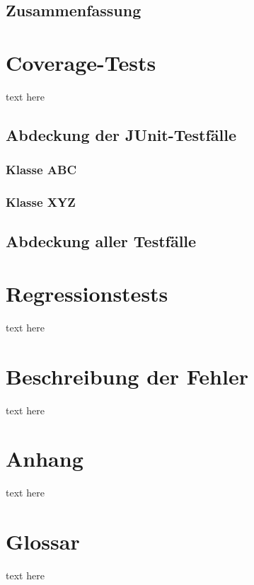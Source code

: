 \documentclass{article}
\begin{document}
  \subsection{Zusammenfassung}

\section{Coverage-Tests}
text here
  \subsection{Abdeckung der JUnit-Testfälle}
    \subsubsection{Klasse ABC}
    \subsubsection{Klasse XYZ}
  \subsection{Abdeckung aller Testfälle}

\section{Regressionstests}
text here

\section{Beschreibung der Fehler}
text here

\section{Anhang}
text here

\section{Glossar}
text here

 \restoregeometry

\glsaddall
\printglossary[numberedsection, style=altlist]
\end{document}
